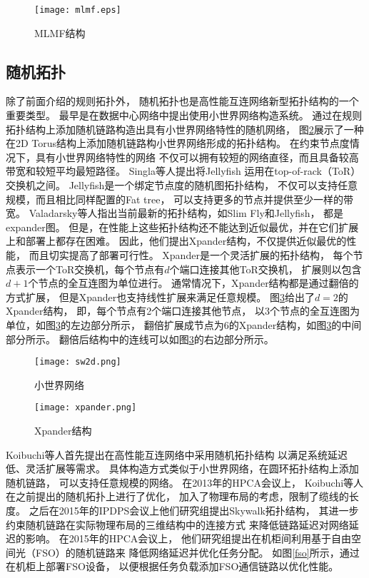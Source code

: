 \begin{figure}[htp]
  \centering
    \texttt{[image: mlmf.eps]}
    \caption{MLMF结构}
    \label{mlmf}
\end{figure}

\subsection{随机拓扑}

除了前面介绍的规则拓扑外，
随机拓扑也是高性能互连网络新型拓扑结构的一个重要类型。
最早是在数据中心网络中提出使用小世界网络构造系统。
通过在规则拓扑结构上添加随机链路构造出具有小世界网络特性的随机网络，
图\ref{sw2d}展示了一种在2D Torus结构上添加随机链路构小世界网络形成的拓扑结构。
在约束节点度情况下，具有小世界网络特性的网络
不仅可以拥有较短的网络直径，而且具备较高带宽和较短平均最短路径。
Singla等人提出将Jellyfish
运用在top-of-rack（ToR）交换机之间。
Jellyfish是一个绑定节点度的随机图拓扑结构，
不仅可以支持任意规模，而且相比同样配置的Fat tree，
可以支持更多的节点并提供至少一样的带宽。
Valadarsky等人指出当前最新的拓扑结构，如Slim Fly和Jellyfish，
都是expander图。
但是，在性能上这些拓扑结构还不能达到近似最优，并在它们扩展上和部署上都存在困难。
因此，他们提出Xpander结构，不仅提供近似最优的性能，
而且切实提高了部署可行性。
Xpander是一个灵活扩展的拓扑结构，
每个节点表示一个ToR交换机，每个节点有$d$个端口连接其他ToR交换机，
扩展则以包含$d+1$个节点的全互连图为单位进行。
通常情况下，Xpander结构都是通过翻倍的方式扩展，
但是Xpander也支持线性扩展来满足任意规模。
图\ref{xpander}给出了$d=2$的Xpander结构，
即，每个节点有2个端口连接其他节点，
以3个节点的全互连图为单位，如图\ref{xpander}的左边部分所示，
翻倍扩展成节点为6的Xpander结构，如图\ref{xpander}的中间部分所示。
翻倍后结构中的连线可以如图\ref{xpander}的右边部分所示。

\begin{figure}[htp]
\centering
\texttt{[image: sw2d.png]}
\caption{小世界网络}
\label{sw2d}
\end{figure}

\begin{figure}[htp]
\centering
\texttt{[image: xpander.png]}
\caption{Xpander结构}
\label{xpander}
\end{figure}

Koibuchi等人首先提出在高性能互连网络中采用随机拓扑结构
以满足系统延迟低、灵活扩展等需求。
具体构造方式类似于小世界网络，在圆环拓扑结构上添加随机链路，
可以支持任意规模的网络。
在2013年的HPCA会议上，
Koibuchi等人在之前提出的随机拓扑上进行了优化，
加入了物理布局的考虑，限制了缆线的长度。
之后在2015年的IPDPS会议上他们研究组提出Skywalk拓扑结构，
其进一步约束随机链路在实际物理布局的三维结构中的连接方式
来降低链路延迟对网络延迟的影响。
在2015年的HPCA会议上，
他们研究组提出在机柜间利用基于自由空间光（FSO）的随机链路来
降低网络延迟并优化任务分配。
如图\ref{fso}所示，通过在机柜上部署FSO设备，
以便根据任务负载添加FSO通信链路以优化性能。

